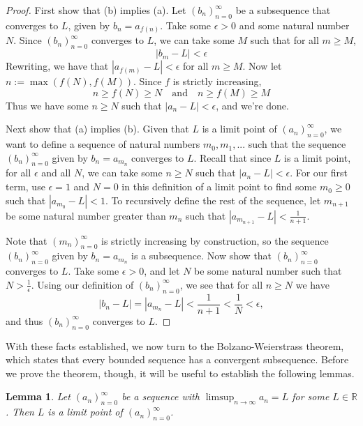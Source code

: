\documentclass[11pt, oneside]{article}
\newcommand{\R}{\mathbb{R}}
\newtheorem{lemma}{Lemma}
\theoremstyle{definition}
\begin{document}
\begin{proof}
    First show that (b) implies (a). Let $(b_n)_{n=0}^\infty$ be a subsequence that converges to $L$, given by $b_n = a_{f(n)}$.
    Take some $\epsilon > 0$ and some natural number $N$. 
    Since  $(b_n)_{n=0}^\infty$ converges to $L$, we can take some $M$ such that for all $m \geq M$,
    $$|b_m - L| < \epsilon$$
    Rewriting, we have that 
    $|a_{f(m)} - L| < \epsilon$
    for all $m \geq M$. Now let $n := \operatorname{max}(f(N), f(M))$. Since $f$ is strictly increasing,
    $$n \geq f(N) \geq N \quad \text{and} \quad n \geq f(M) \geq M$$
    Thus we have some $n \geq N$ such that $|a_n - L| < \epsilon$, and we're done.

    \vspace*{0.5em}
    Next show that (a) implies (b). Given that $L$ is a limit point of $(a_n)_{n=0}^\infty$, we want
    to define a sequence of natural numbers
    $m_0, m_1, ...$ such that the sequence $(b_n)_{n=0}^\infty$ given by $b_n = a_{m_n}$ converges to $L$.
    Recall that since $L$ is a limit point, for all $\epsilon$ and all $N$, we can take some $n \geq N$ such that $|a_n - L| < \epsilon$.
    For our first term, use $\epsilon = 1$ and $N = 0$ in this definition of a limit point to find some $m_0 \geq 0$ such that $|a_{m_0} - L| < 1$.
    To recursively define the rest of the sequence, let $m_{n+1}$ be some natural number greater than $m_n$ such that $|a_{m_{n+1}} - L| < \frac{1}{n + 1}$.

    Note that $(m_n)_{n=0}^\infty$ is strictly increasing by construction, so the sequence $(b_n)_{n=0}^\infty$ given by $b_n = a_{m_n}$ is a subsequence.
    Now show that $(b_n)_{n=0}^\infty$ converges to $L$. Take some $\epsilon > 0$, and let $N$ be some natural number such that $N > \frac{1}{\epsilon}$.
    Using our definition of $(b_n)_{n=0}^\infty$, we see that for all $n \geq N$ we have
    $$|b_n - L| = |a_{m_n} - L| < \frac{1}{n + 1} < \frac{1}{N} < \epsilon,$$
    and thus $(b_n)_{n=0}^\infty$ converges to $L$.

\end{proof}

With these facts established, we now turn to the Bolzano-Weierstrass theorem, which states that every bounded sequence has a convergent subsequence.
Before we prove the theorem, though, it will be useful to establish the following lemmas.

\begin{lemma}\label{limpts}
    Let $(a_n)_{n=0}^\infty$ be a sequence with $\limsup_{n \rightarrow \infty} a_n = L$ for some $L \in \R$.
    Then $L$ is a limit point of $(a_n)_{n=0}^\infty$.
\end{lemma}
\end{document}
